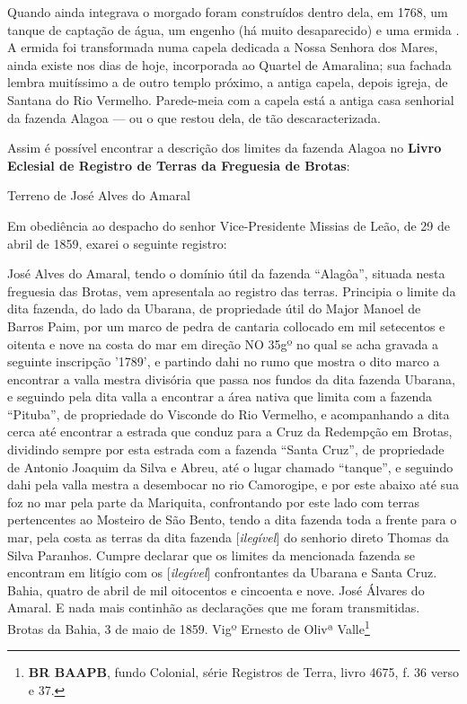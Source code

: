 Quando ainda integrava o morgado foram construídos dentro dela, em 1768, um tanque de captação de água, um engenho (há muito desaparecido) e uma ermida \cite[p.~118]{campos_alagoa_1942}. A ermida foi transformada numa capela dedicada a Nossa Senhora dos Mares, ainda existe nos dias de hoje, incorporada ao Quartel de Amaralina; sua fachada lembra muitíssimo a de outro templo próximo, a antiga capela, depois igreja, de Santana do Rio Vermelho. Parede-meia com a capela está a antiga casa senhorial da fazenda Alagoa --- ou o que restou dela, de tão descaracterizada.

Assim é possível encontrar a descrição dos limites da fazenda Alagoa no \textbf{Livro Eclesial de Registro de Terras da Freguesia de Brotas}:

\begin{citacao}
Terreno de José Alves do Amaral

Em obediência ao despacho do senhor Vice-Presidente Missias de Leão, de 29 de abril de 1859, exarei o seguinte registro:

José Alves do Amaral, tendo o domínio útil da fazenda ``Alagôa'', situada nesta freguesia das Brotas, vem apresentala ao registro das terras. Principia o limite da dita fazenda, do lado da Ubarana, de propriedade útil do Major Manoel de Barros Paim, por um marco de pedra de cantaria collocado em mil setecentos e oitenta e nove na costa do mar em direção NO 35gº no qual se acha gravada a seguinte inscripção '1789', e partindo dahi no rumo que mostra o dito marco a encontrar a valla mestra divisória que passa nos fundos da dita fazenda Ubarana, e seguindo pela dita valla a encontrar a área nativa que limita com a fazenda ``Pituba'', de propriedade do Visconde do Rio Vermelho, e acompanhando a dita cerca até encontrar a estrada que conduz para a Cruz da Redempção em Brotas, dividindo sempre por esta estrada com a fazenda ``Santa Cruz'', de propriedade de Antonio Joaquim da Silva e Abreu, até o lugar chamado ``tanque'', e seguindo dahi pela valla mestra a desembocar no rio Camorogipe, e por este abaixo até sua foz no mar pela parte da Mariquita, confrontando por este lado com terras pertencentes ao Mosteiro de São Bento, tendo a dita fazenda toda a frente para o mar, pela costa as terras da dita fazenda [\textit{ilegível}] do senhorio direto Thomas da Silva Paranhos. Cumpre declarar que os limites da mencionada fazenda se encontram em litígio com os [\textit{ilegível}] confrontantes da Ubarana e Santa Cruz. Bahia, quatro de abril de mil oitocentos e cincoenta e nove. José Álvares do Amaral. E nada mais continhão as declarações que me foram transmitidas. Brotas da Bahia, 3 de maio de 1859. Vigº Ernesto de Olivª Valle\footnote{\textbf{BR BAAPB}, fundo Colonial, série Registros de Terra, livro 4675, f. 36 verso e 37.}
\end{citacao}


